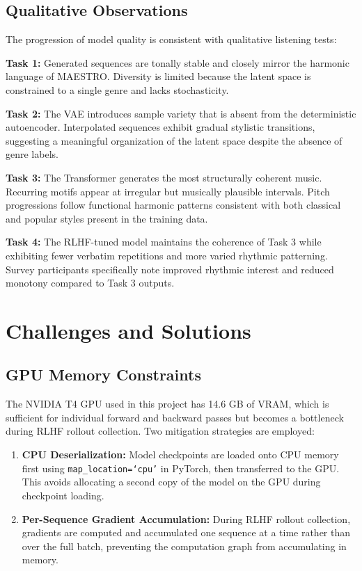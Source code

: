 \documentclass{article}
\begin{document}
\subsection{Qualitative Observations}

The progression of model quality is consistent with qualitative listening tests:

\textbf{Task 1:} Generated sequences are tonally stable and closely mirror the harmonic language of MAESTRO. Diversity is limited because the latent space is constrained to a single genre and lacks stochasticity.

\textbf{Task 2:} The VAE introduces sample variety that is absent from the deterministic autoencoder. Interpolated sequences exhibit gradual stylistic transitions, suggesting a meaningful organization of the latent space despite the absence of genre labels.

\textbf{Task 3:} The Transformer generates the most structurally coherent music. Recurring motifs appear at irregular but musically plausible intervals. Pitch progressions follow functional harmonic patterns consistent with both classical and popular styles present in the training data.

\textbf{Task 4:} The RLHF-tuned model maintains the coherence of Task 3 while exhibiting fewer verbatim repetitions and more varied rhythmic patterning. Survey participants specifically note improved rhythmic interest and reduced monotony compared to Task 3 outputs.

\section{Challenges and Solutions}
\label{sec:challenges}

\subsection{GPU Memory Constraints}

The NVIDIA T4 GPU used in this project has 14.6 GB of VRAM, which is sufficient for individual forward and backward passes but becomes a bottleneck during RLHF rollout collection. Two mitigation strategies are employed:

\begin{enumerate}
  \item \textbf{CPU Deserialization:} Model checkpoints are loaded onto CPU memory first using \texttt{map\_location=`cpu'} in PyTorch, then transferred to the GPU. This avoids allocating a second copy of the model on the GPU during checkpoint loading.
  \item \textbf{Per-Sequence Gradient Accumulation:} During RLHF rollout collection, gradients are computed and accumulated one sequence at a time rather than over the full batch, preventing the computation graph from accumulating in memory.
\end{enumerate}
\end{document}
